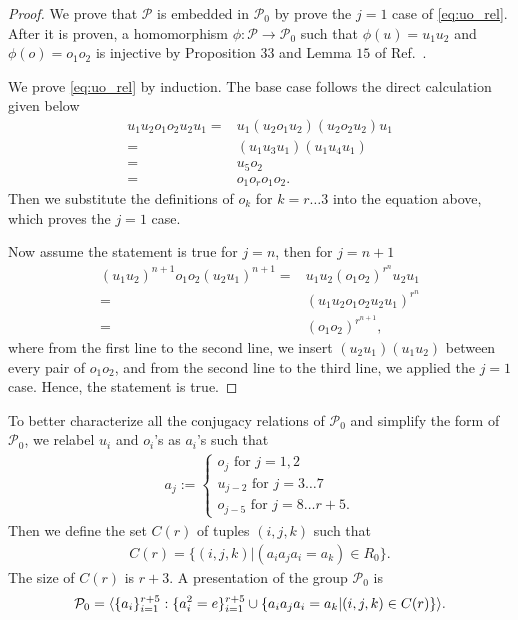 \documentclass[11pt,letterpaper]{article}
\DeclarePairedDelimiter{\ip}{\langle}{\rangle}
\newcommand{\1}{\mathbb{1}}
\newcommand{\Pg}{\mathcal{P}}
\theoremstyle{definition}
\begin{document}
\begin{proof}
    We prove that $\Pg$ is embedded in $\Pg_0$ by prove the $j = 1$ case of \cref{eq:uo_rel}.
    After it is proven, a homomorphism $\phi: \Pg \rightarrow \Pg_0$ such that $\phi(u) = u_1u_2$ and $\phi(o) = o_1o_2$ is injective by Proposition $33$
    and Lemma $15$ of Ref.~\cite{slofstra2017}.
    
	We prove \cref{eq:uo_rel} by induction.
	The base case follows the direct calculation given below
	\begin{align*} 
		u_1u_2 o_1o_2 u_2u_1 = &u_1 (u_2 o_1u_2) (u_2o_2 u_2) u_1 \\
	=& (u_1 u_3 u_1) (u_1 u_4 u_1)\\
	=& u_5 o_2\\
	=& o_1o_ro_1 o_2.
	\end{align*}
	Then we substitute the definitions of $o_k$ for $k = r \dots 3$ into the equation above, which 
	proves the $j=1$ case.
	
	Now assume the statement is true for $j = n$, then for $j = n+1$
	\begin{align*}
		(u_1u_2)^{n+1} o_1o_2 (u_2u_1)^{n+1} =& u_1u_2 (o_1o_2)^{r^n} u_2u_1 \\ 
		 =& (u_1u_2 o_1o_2 u_2u_1)^{r^n} \\
		 =& (o_1o_2)^{r^{n+1}},
	\end{align*}
	where from the first line to the second line, we insert $(u_2u_1)(u_1u_2)$ between every pair of $o_1o_2$, and
	from the second line to the third line, we applied the $j=1$ case. Hence, the statement is true.
\end{proof}
To better characterize all the conjugacy
relations of $\Pg_0$ and simplify the form of $\Pg_0$, 
we relabel $u_i$ and $o_i$'s
as $a_i$'s such that
\begin{align}
	a_j := 
	\begin{cases}
	 o_j \text{ for } j = 1,2 \\
	 u_{j-2} \text{ for } j = 3\dots 7 \\
	 o_{j-5} \text{ for } j = 8 \dots r+5.
	\end{cases}
\end{align}
Then we define the set $C(r)$ of tuples $(i,j,k)$ such that
\begin{align}
\label{eq:cr}
	C(r) = \{ (i,j,k) |  (a_ia_ja_i = a_k) \in R_0 \}.
\end{align}
The size of $C(r)$ is $r+3$. 
A presentation of the group $\Pg_0$ is
\begin{align*}
    \Pg_0 = \ip{ \{a_i\}_{i=1}^{r+5} : \{a_i^2 =e \}_{i=1}^{r+5} \cup \{ a_ia_ja_i = a_k \vert (i,j,k) \in C(r)\}}.
\end{align*}
\end{document}
